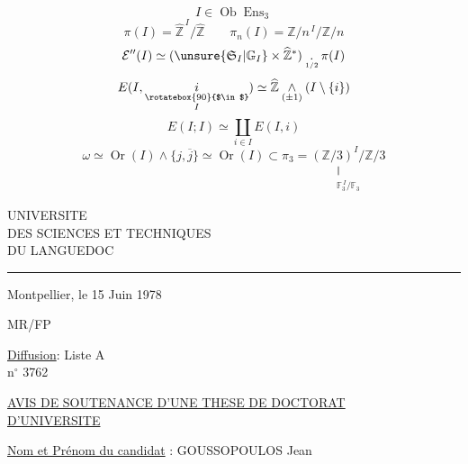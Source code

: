 \[
I\in\operatorname{Ob}\operatorname{Ens}_3
\]
\[
\pi(I)=\widehat{\mathbb Z}^{\,I}/\widehat{\mathbb Z}
\qquad
\pi_n(I)=\mathbb Z/n^{\,I}/\mathbb Z/n
\]
\[
\mathcal E''(I)\simeq
(\unsure{\mathfrak S_I|\mathbb G_I}\times\widehat{\mathbb Z}^{*})
\mathbin{\underset{\scriptscriptstyle1/2}{.}}\pi(I)
\]
\[
E(I,\underset{\substack{\rotatebox{90}{$\in$}\\I}}i)
\simeq\widehat{\mathbb Z}\mathbin{\underset{(\pm1)}{\wedge}}
(I\setminus\{i\})
\]
\[
E(I;I)\simeq\coprod_{i\in I}E(I,i)
\]
\[
\omega\simeq\operatorname{Or}(I)\wedge\{j,\overline j\}
\simeq\operatorname{Or}(I)\subset\pi_3
=\underset{\substack{\Vert\\\mathbb F_3^{\,I}/\mathbb F_3}}{(\mathbb Z/3)^I/\mathbb Z/3}
\]
\diagram{\[
\begin{tikzcd}[ampersand replacement=\&,row sep=large]
E(I,\omega)=p_3^{-1}(\omega)\subset\pi_\infty(I)
\arrow[d,"\deleted{\unsure{\alpha_\infty(\omega)}}"']\\
E(I,i)
\end{tikzcd}
\qquad
\begin{tikzcd}[ampersand replacement=\&,column sep=small,row sep=small]
0\arrow[r,no head]\&\pi_\infty(I)\arrow[r,no head]\&
\pi_\infty(I)\arrow[r]\&\pi_3(I)\arrow[r,no head]\&0\\
\&\&\&\omega\arrow[u,phantom,"\cup" description]\&
\end{tikzcd}
\]}

UNIVERSITE\\
DES SCIENCES ET TECHNIQUES\\
DU LANGUEDOC\\
\rule{2cm}{0.4pt}

Montpellier, le 15 Juin 1978

MR/FP

\uline{Diffusion}: Liste A\\
n$^{\circ}$ 3762

\uline{AVIS DE SOUTENANCE D'UNE THESE DE DOCTORAT}\\
\uline{D'UNIVERSITE}

\uline{Nom et Prénom du candidat} : GOUSSOPOULOS Jean

